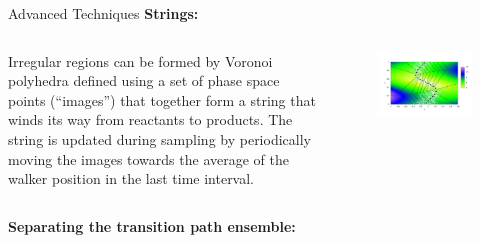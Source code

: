 \documentclass[final]{beamer}
\begin{document}
\begin{columns}[t]
      \begin{column}{.25 \linewidth}

	\begin{block}{Advanced Techniques}
	  \textbf{Strings:}

	  \begin{columns}[t]
	    \begin{column}{.45\linewidth}

	  Irregular regions can be formed by Voronoi polyhedra defined using a set of phase space points (``images'') that together form a string that winds its way from reactants to products.
	  The string is updated during sampling by periodically moving the images towards the average of the walker position in the last time interval.

	    \end{column}
	    \begin{column}{.45\linewidth}
	      \begin{figure}
		\includegraphics[width=1.0\linewidth]{images/whiteandblue.pdf}
	      \end{figure}
	    \end{column}
	  \end{columns}
	  \vspace{30 mm}
	  \textbf{Separating the transition path ensemble:}


\end{block}
\end{column}
\end{columns}
\end{document}
